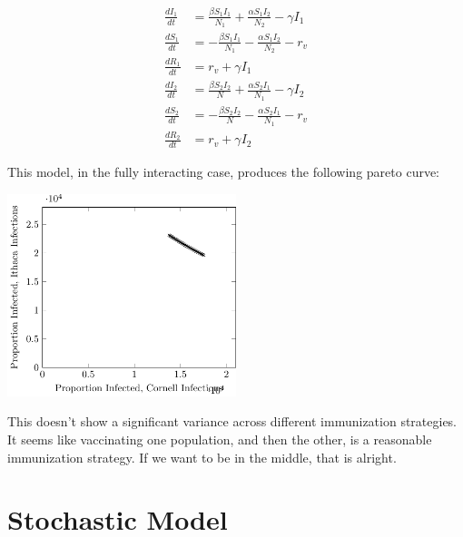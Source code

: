 \documentclass[titlepage]{article}
\begin{document}
\begin{align*}
\frac{dI_1}{dt} & = \frac{ \beta S_1 I_1}{N_1} + \frac{ \alpha S_1 I_2 }{N_2} - \gamma I_1\\
\frac{dS_1}{dt} & = -\frac{\beta S_1 I_1}{N_1}  - \frac{ \alpha S_1 I_2 }{N_2} - r_v \\
\frac{dR_1}{dt} & = r_v + \gamma I_1 \\
\frac{dI_2}{dt} & = \frac{ \beta S_2 I_2}{N}  + \frac{ \alpha S_2 I_1 }{N_1} - \gamma I_2\\
\frac{dS_2}{dt} & = -\frac{\beta S_2 I_2}{N}  - \frac{ \alpha S_2 I_1 }{N_1} - r_v \\
\frac{dR_2}{dt} & = r_v + \gamma I_2
\end{align*}

This model, in the fully interacting case, produces the following pareto curve:

\includegraphics[width=0.5\textwidth]{figures/sir-interacting.pdf}

This doesn't show a significant variance across different immunization strategies.
It seems like vaccinating one population, and then the other, is a reasonable
	immunization strategy.
If we want to be in the middle, that is alright.


\section{Stochastic Model}
\end{document}
